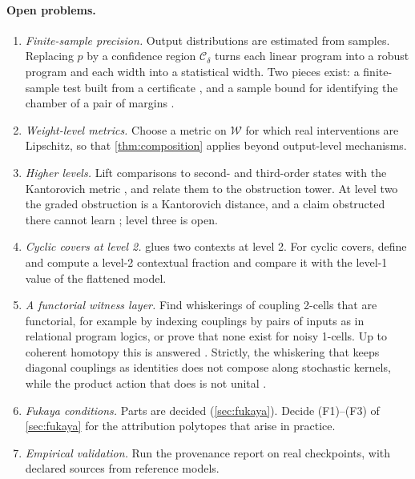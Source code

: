 \documentclass[11pt]{article}
\theoremstyle{definition}
\theoremstyle{remark}
\newcommand{\cW}{\mathcal{W}}
\begin{document}
\paragraph{Open problems.}
\begin{enumerate}[leftmargin=*]
\item \emph{Finite-sample precision.} Output distributions are estimated from samples. Replacing $p$ by
  a confidence region $\mathcal C_\delta$ turns each linear program into a robust program and each width
  into a statistical width. Two pieces exist: a finite-sample test built from a certificate
  \cite[Prop.~11.1]{Awasthi-Tower}, and a sample bound for identifying the chamber of a pair of margins
  \cite[Prop.~12.2]{Awasthi-Conditionals}.
\item \emph{Weight-level metrics.} Choose a metric on $\cW$ for which real interventions are Lipschitz,
  so that \cref{thm:composition} applies beyond output-level mechanisms.
\item \emph{Higher levels.} Lift comparisons to second- and third-order states with the Kantorovich
  metric \cite{FritzPerrone2019}, and relate them to the obstruction tower. At level two the graded obstruction is a
  Kantorovich distance, and a claim obstructed there cannot learn \cite[Lemma~52.1, Cor.~52.3]{Awasthi-ThreeLayers}; level
  three is open.
\item \emph{Cyclic covers at level 2.}  glues two contexts at level 2. For cyclic
  covers, define and compute a level-2 contextual fraction and compare it with the level-1 value of
  the flattened model.
\item \emph{A functorial witness layer.} Find whiskerings of coupling 2-cells that are functorial, for
  example by indexing couplings by pairs of inputs as in relational program logics, or prove that none
  exist for noisy 1-cells. Up to coherent homotopy this is answered \cite[Thm.~5.2]{Awasthi-Conditionals}. Strictly, the
  whiskering that keeps diagonal couplings as identities does not compose along stochastic kernels, while the product
  action that does is not unital \cite[Thm.~10.2]{Awasthi-Conditionals}.
\item \emph{Fukaya conditions.} Parts are decided (\cref{sec:fukaya}). Decide (F1)--(F3) of \cref{sec:fukaya} for the attribution polytopes
  that arise in practice.
\item \emph{Empirical validation.} Run the provenance report on real checkpoints, with declared sources
  from reference models.
\end{enumerate}
\end{document}
